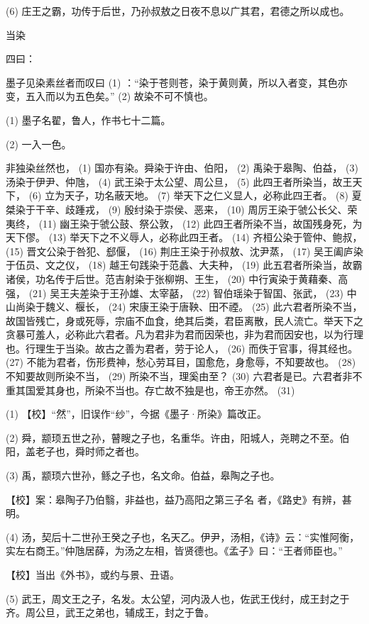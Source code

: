 \documentclass[12pt,UTF8]{ctexbook}
\begin{document}
(6) 庄王之霸，功传于后世，乃孙叔敖之日夜不息以广其君，君德之所以成也。





当染


四曰：

墨子见染素丝者而叹曰 (1) ：“染于苍则苍，染于黄则黄，所以入者变，其色亦变，五入而以为五色矣。” (2) 故染不可不慎也。

(1) 墨子名翟，鲁人，作书七十二篇。

(2) 一入一色。

非独染丝然也， (1) 国亦有染。舜染于许由、伯阳， (2) 禹染于皋陶、伯益， (3) 汤染于伊尹、仲虺， (4) 武王染于太公望、周公旦， (5) 此四王者所染当，故王天下， (6) 立为天子，功名蔽天地。 (7) 举天下之仁义显人，必称此四王者。 (8) 夏桀染于干辛、歧踵戎， (9) 殷纣染于崇侯、恶来， (10) 周厉王染于虢公长父、荣夷终， (11) 幽王染于虢公鼓、祭公敦， (12) 此四王者所染不当，故国残身死，为天下僇。 (13) 举天下之不义辱人，必称此四王者。 (14) 齐桓公染于管仲、鲍叔， (15) 晋文公染于咎犯、郄偃， (16) 荆庄王染于孙叔敖、沈尹蒸， (17) 吴王阖庐染于伍员、文之仪， (18) 越王句践染于范蠡、大夫种， (19) 此五君者所染当，故霸诸侯，功名传于后世。范吉射染于张柳朔、王生， (20) 中行寅染于黄藉秦、高强， (21) 吴王夫差染于王孙雄、太宰嚭， (22) 智伯瑶染于智国、张武， (23) 中山尚染于魏义、椻长， (24) 宋康王染于唐鞅、田不禋。 (25) 此六君者所染不当，故国皆残亡，身或死辱，宗庙不血食，绝其后类，君臣离散，民人流亡。举天下之贪暴可羞人，必称此六君者。凡为君非为君而因荣也，非为君而因安也，以为行理也。行理生于当染。故古之善为君者，劳于论人， (26) 而佚于官事，得其经也。 (27) 不能为君者，伤形费神，愁心劳耳目，国愈危，身愈辱，不知要故也。 (28) 不知要故则所染不当， (29) 所染不当，理奚由至？ (30) 六君者是已。六君者非不重其国爱其身也，所染不当也。存亡故不独是也，帝王亦然。 (31)

(1) 【校】“然”，旧误作“纱”，今据《墨子·所染》篇改正。

(2) 舜，颛顼五世之孙，瞽瞍之子也，名重华。许由，阳城人，尧聘之不至。伯阳，盖老子也，舜时师之者也。

(3) 禹，颛顼六世孙，鲧之子也，名文命。伯益，皋陶之子也。

【校】案：皋陶子乃伯翳，非益也，益乃高阳之第三子名 者，《路史》有辨，甚明。

(4) 汤，契后十二世孙王癸之子也，名天乙。伊尹，汤相，《诗》云：“实惟阿衡，实左右商王。”仲虺居薛，为汤之左相，皆贤德也。《孟子》曰：“王者师臣也。”

【校】当出《外书》，或约与景、丑语。

(5) 武王，周文王之子，名发。太公望，河内汲人也，佐武王伐纣，成王封之于齐。周公旦，武王之弟也，辅成王，封之于鲁。
\end{document}
